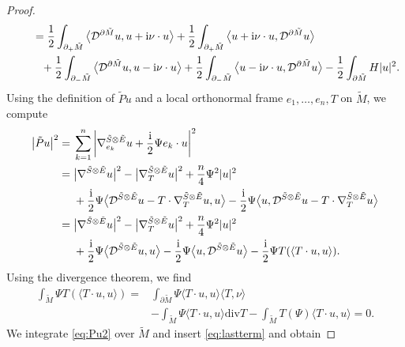 \documentclass[pdftex]{sigma}
\numberwithin{equation}{section}
\begin{document}
\begin{proof}
\begin{align}
&\qquad= \frac{1}{2} \int_{\partial_+ \tilde{M}} \big\langle \mathcal{D}^{\partial \tilde{M}} u,u + {\rm i} \nu \cdot u \big\rangle + \frac{1}{2} \int_{\partial_+ \tilde{M}} \big\langle u + {\rm i} \nu \cdot u,\mathcal{D}^{\partial \tilde{M}} u \big\rangle\nonumber \\
&\qquad\phantom{=}{} + \frac{1}{2} \int_{\partial_- \tilde{M}} \big\langle \mathcal{D}^{\partial \tilde{M}} u,u - {\rm i} \nu \cdot u \big\rangle + \frac{1}{2} \int_{\partial_- \tilde{M}} \big\langle u - {\rm i} \nu \cdot u,\mathcal{D}^{\partial \tilde{M}} u \big\rangle
 - \frac{1}{2} \int_{\partial \tilde{M}} H |u|^2.\label{eq:formula1}
\end{align}
Using the definition of $\tilde{P} u$ and a local orthonormal frame $e_1,\dots,e_n,T$ on $\tilde{M}$, we compute
\begin{align}
\big|\tilde{P} u\big|^2
={}&
\sum_{k=1}^n \left| \nabla_{e_k}^{\tilde{S} \otimes \tilde{E}} u + \frac{\rm i}{2} \Psi e_k \cdot u \right|^2 \nonumber\\
={}&
\big|\nabla^{\tilde{S} \otimes \tilde{E}} u\big|^2 - \big|\nabla_T^{\tilde{S} \otimes \tilde{E}} u\big|^2 + \frac{n}{4} \Psi^2 |u|^2 \nonumber\\
& + \frac{\rm i}{2} \Psi \big\langle \mathcal{D}^{\tilde{S} \otimes \tilde{E}} u - T \cdot \nabla_T^{\tilde{S} \otimes \tilde{E}} u,u \big\rangle - \frac{\rm i}{2} \Psi \big\langle u,\mathcal{D}^{\tilde{S} \otimes \tilde{E}} u - T \cdot \nabla_T^{\tilde{S} \otimes \tilde{E}} u \big\rangle \nonumber\\
={}&
\big|\nabla^{\tilde{S} \otimes \tilde{E}} u\big|^2 - \big|\nabla_T^{\tilde{S} \otimes \tilde{E}} u\big|^2 + \frac{n}{4} \Psi^2 |u|^2 \nonumber\\
& + \frac{\rm i}{2} \Psi \big\langle \mathcal{D}^{\tilde{S} \otimes \tilde{E}} u,u \big\rangle - \frac{\rm i}{2} \Psi \big\langle u,\mathcal{D}^{\tilde{S} \otimes \tilde{E}} u \big\rangle - \frac{\rm i}{2} \Psi T(\langle T \cdot u,u \rangle).\label{eq:Pu2}
\end{align}
Using the divergence theorem, we find
\begin{align}
\int_{\tilde{M}} \Psi T(\langle T \cdot u,u \rangle)
={}& \int_{\partial \tilde{M}} \Psi \langle T \cdot u,u \rangle \langle T,\nu \rangle \nonumber\\
& - \int_{\tilde{M}} \Psi \langle T \cdot u,u \rangle \mathrm{div} T - \int_{\tilde{M}} T(\Psi) \langle T \cdot u,u \rangle = 0 .\label{eq:lastterm}
\end{align}
We integrate \eqref{eq:Pu2} over $\tilde{M}$ and insert \eqref{eq:lastterm} and obtain

\end{proof}
\end{document}
